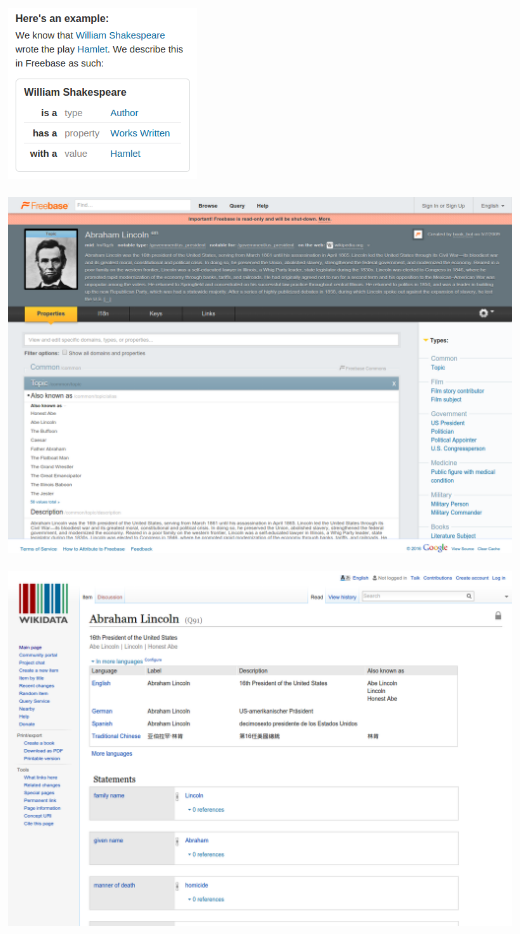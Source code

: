 \documentclass{beamer}
\begin{document}
\begin{frame}
  \begin{center}
    \includegraphics[width=5cm]{freebase}
  \end{center}
\end{frame}

\begin{frame}
  \begin{center}
    \includegraphics[width=\textwidth]{freebaseabe}
  \end{center}
\end{frame}

\begin{frame}
  \begin{center}
    \includegraphics[width=\textwidth]{wikiabe}
  \end{center}
\end{frame}
\end{document}
